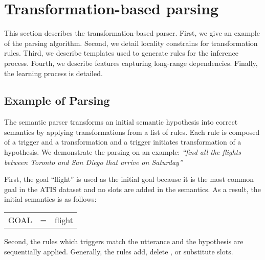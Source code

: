 \documentclass{article}
\begin{document}
\section{Transformation-based parsing} \label{sec:tbl}
This section describes the transformation-based parser. 
First, we give an example of the parsing algorithm. 
Second, we detail locality constrains for transformation rules.
Third, we describe templates used to generate rules for the inference process. 
Fourth, we describe features capturing long-range dependencies.
Finally, the learning process is detailed. 

\subsection{Example of Parsing} \label{sec:tbl:example}
The semantic parser transforms an initial semantic hypothesis into correct semantics by applying transformations from a list of rules. Each rule is composed of a trigger and a transformation and a trigger initiates transformation of a hypothesis. 
We demonstrate the parsing on an example: \textit{``find all the flights between Toronto and San Diego that arrive on Saturday''} 

First, the goal ``flight'' is used as the initial goal because it is the most common goal in the ATIS dataset and no slots are added in the semantics. As a result, the initial semantics is as follows:

\vspace{.15cm}
\begin{tabular}{lll}
  GOAL & = & flight
\end{tabular} 
\vspace{.15cm}

Second, the rules which triggers match the utterance and the hypothesis are sequentially applied. Generally, the rules add, delete , or substitute slots. 
\end{document}
